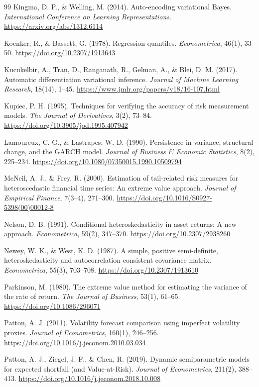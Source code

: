 \documentclass[12pt,a4paper]{article}
\theoremstyle{definition}
\theoremstyle{remark}
\begin{document}
\begin{thebibliography}{99}
 Kingma, D. P., \& Welling, M. (2014). Auto-encoding variational Bayes. \emph{International Conference on Learning Representations}. \url{https://arxiv.org/abs/1312.6114}

 Koenker, R., \& Bassett, G. (1978). Regression quantiles. \emph{Econometrica}, 46(1), 33--50. \url{https://doi.org/10.2307/1913643}

 Kucukelbir, A., Tran, D., Ranganath, R., Gelman, A., \& Blei, D. M. (2017). Automatic differentiation variational inference. \emph{Journal of Machine Learning Research}, 18(14), 1--45. \url{https://www.jmlr.org/papers/v18/16-107.html}

 Kupiec, P. H. (1995). Techniques for verifying the accuracy of risk measurement models. \emph{The Journal of Derivatives}, 3(2), 73--84. \url{https://doi.org/10.3905/jod.1995.407942}

 Lamoureux, C. G., \& Lastrapes, W. D. (1990). Persistence in variance, structural change, and the GARCH model. \emph{Journal of Business \& Economic Statistics}, 8(2), 225--234. \url{https://doi.org/10.1080/07350015.1990.10509794}

 McNeil, A. J., \& Frey, R. (2000). Estimation of tail-related risk measures for heteroscedastic financial time series: An extreme value approach. \emph{Journal of Empirical Finance}, 7(3--4), 271--300. \url{https://doi.org/10.1016/S0927-5398(00)00012-8}

 Nelson, D. B. (1991). Conditional heteroskedasticity in asset returns: A new approach. \emph{Econometrica}, 59(2), 347--370. \url{https://doi.org/10.2307/2938260}

 Newey, W. K., \& West, K. D. (1987). A simple, positive semi-definite, heteroskedasticity and autocorrelation consistent covariance matrix. \emph{Econometrica}, 55(3), 703--708. \url{https://doi.org/10.2307/1913610}

 Parkinson, M. (1980). The extreme value method for estimating the variance of the rate of return. \emph{The Journal of Business}, 53(1), 61--65. \url{https://doi.org/10.1086/296071}

 Patton, A. J. (2011). Volatility forecast comparison using imperfect volatility proxies. \emph{Journal of Econometrics}, 160(1), 246--256. \url{https://doi.org/10.1016/j.jeconom.2010.03.034}

 Patton, A. J., Ziegel, J. F., \& Chen, R. (2019). Dynamic semiparametric models for expected shortfall (and Value-at-Risk). \emph{Journal of Econometrics}, 211(2), 388--413. \url{https://doi.org/10.1016/j.jeconom.2018.10.008}


\end{thebibliography}
\end{document}
